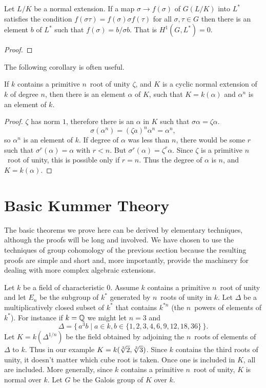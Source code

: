 \begin{proposition}
Let $L/K$ be a normal extension.  If a map $\sigma \rightarrow
f(\sigma)$ of $G(L/K)$ into $L^{\ast}$ satisfies the condition
$f(\sigma \tau)= f(\sigma) \sigma f(\tau)$ for all $\sigma, \tau \in
G$ then there is an element $b$ of $L^{\ast}$ such that $f(\sigma) = b
/ \sigma b$.  That is $H^1(G,L^{\ast}) = 0$.
\end{proposition}

\begin{proof}
\end{proof}

The following corollary is often useful.

\begin{corollary}
If $k$ contains a primitive $n$\th\ root of unity $\zeta$, and $K$ is
a cyclic normal extension of $k$ of degree $n$, then there is an
element $\alpha$ of $K$, such that $K = k(\alpha)$ and $\alpha^n$ is
an element of $k$.
\end{corollary}

\begin{proof}
$\zeta$ has norm $1$, therefore there is an $\alpha$ in $K$ such
that $\sigma \alpha = \zeta \alpha$.
\[
\sigma(\alpha^n) = (\zeta a)^n \alpha^n = \alpha^n,
\]
so $\alpha^n$ is an element of $k$.  If degree of $\alpha$ was less
than $n$, there would be some $r$ such that $\sigma^r(\alpha) =
\alpha$ with $r < n$.  But $\sigma^r(\alpha) = \zeta^r \alpha$.  Since
$\zeta$ is a primitive $n$\th\ root of unity, this is possible only if
$r = n$.  Thus the degree of $\alpha$ is $n$, and $K = k(\alpha)$.
\end{proof}

\section{Basic Kummer Theory}
\label{Basic:Kummer:Theory:Sec}

The basic theorems we prove here can be derived by elementary techniques,
although the proofs will be long and involved.  We have chosen to use the
techniques of group cohomology of the previous section because the
resulting proofs are simple and short and, more importantly, provide the
machinery for dealing with more complex algebraic extensions.

Let $k$ be a field of characteristic $0$.  Assume $k$ contains a
primitive $n$\th\ root of unity and let $E_n$ be the subgroup of
$k^{\ast}$ generated by $n$\th\ roots of unity in $k$.  Let $\Delta$ be a
multiplicatively closed subset of $k^{\ast}$ that contains $k^{\ast n}$
(the $n$\th\ powers of elements of $k^{\ast}$).  For instance if $k = \mathbb{Q}$
we might let $n = 3$ and  
\[
\Delta = 
  \{\,a^3 b \mid a \in k, b \in \{1, 2, 3, 4, 6, 9, 12, 18, 36\}\,\}.
\]
Let $K = k(\Delta^{1/n})$ be the field obtained by adjoining the 
$n$\th\ roots of elements of $\Delta$ to $k$.  Thus in our example $K 
= k(\root 3 \of{2}, \root 3 \of {3})$.  Since $k$ contains the third
roots of unity, it doesn't matter which cube root is taken.  Once one is
included in $K$, all are included.  More generally, since $k$
contains a primitive $n$\th\ root of unity, $K$ is normal over $k$.
Let $G$ be the Galois group of $K$ over $k$.


